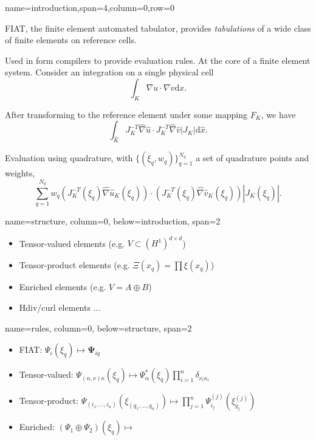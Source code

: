 \documentclass[a0paper,portrait]{baposter}
\begin{document}
\begin{poster}
  {name=introduction,span=4,column=0,row=0}{
    \begin{multicols}{3}
      FIAT, the finite element automated tabulator, provides
      \emph{tabulations} of a wide class of finite elements on
      reference cells.

      Used in form compilers to provide evaluation rules.
      At the core of a finite element system.  Consider an integration
      on a single physical cell
      \begin{equation*}
        \int_K \nabla u \cdot \nabla v \text{d}x.
      \end{equation*}

      After transforming to the reference element under some mapping
      $F_K$, we have
      \begin{equation*}
        \int_{\hat{K}} J_K^{-T} \hat{\nabla}\hat{u} \cdot J_K^{-T}
        \hat{\nabla}\hat{v} |J_K|\text{d}\hat{x}.
      \end{equation*}

      Evaluation using quadrature, with $\{(\xi_q, w_q)\}_{q=1}^{N_q}$
      a set of quadrature points and weights,
      \begin{equation*}
        \sum_{q=1}^{N_q} w_q ( J_K^{-T}(\xi_q) \hat{\nabla}
        \hat{u}_K(\xi_q) ) \cdot ( J_K^{-T}(\xi_q) \hat{\nabla}
        \hat{v}_K(\xi_q) ) \left| J_K(\xi_q) \right| .
      \end{equation*}
    \end{multicols}
  }

  {name=structure, column=0, below=introduction, span=2}
  {
    \begin{itemize}
    \item Tensor-valued elements (e.g. $V \subset {(H^1)}^{d\times d}$)
    \item Tensor-product elements (e.g. $\Xi(x_q) = \prod \xi(x_q)$)
    \item Enriched elements (e.g. $V = A \oplus B$)
    \item Hdiv/curl elements ...
    \end{itemize}
  }

  {name=rules, column=0, below=structure, span=2}
  {
    \begin{itemize}
    \item FIAT: $\Psi_i(\xi_q) \mapsto \mathbf{\Psi}_{iq}$

    \item Tensor-valued: $\Psi_{(\alpha, \nu)\kappa}(\xi_q) \mapsto
      \Psi^{*}_\alpha(\xi_q)\prod_{i=1}^{n}\delta_{\nu_i \kappa_i}$
    \item Tensor-product: $\Psi_{(i_1, \dots, i_n)}(\xi_{(q_1, \dots,
        q_n)}) \mapsto \prod_{j=1}^{n}
      \Psi_{i_j}^{(j)}(\xi_{q_j}^{(j)})$
    \item Enriched: $(\Psi_1 \oplus \Psi_2)(\xi_q) \mapsto $
    \end{itemize}
  }


\end{poster}
\end{document}
